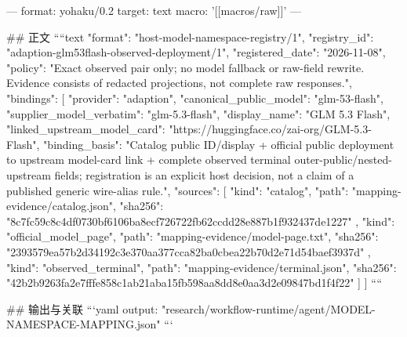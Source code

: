 ---
format: yohaku/0.2
target: text
macro: '[[macros/raw]]'
---

## 正文
````text
{
  "format": "host-model-namespace-registry/1",
  "registry_id": "adaption-glm53flash-observed-deployment/1",
  "registered_date": "2026-11-08",
  "policy": "Exact observed pair only; no model fallback or raw-field rewrite. Evidence consists of redacted projections, not complete raw responses.",
  "bindings": [
    {
      "provider": "adaption",
      "canonical_public_model": "glm-53-flash",
      "supplier_model_verbatim": "glm-5.3-flash",
      "display_name": "GLM 5.3 Flash",
      "linked_upstream_model_card": "https://huggingface.co/zai-org/GLM-5.3-Flash",
      "binding_basis": "Catalog public ID/display + official public deployment to upstream model-card link + complete observed terminal outer-public/nested-upstream fields; registration is an explicit host decision, not a claim of a published generic wire-alias rule.",
      "sources": [
        {
          "kind": "catalog",
          "path": "mapping-evidence/catalog.json",
          "sha256": "8c7fc59c8c4df0730bf6106ba8ecf726722fb62ccdd28e887b1f932437de1227"
        },
        {
          "kind": "official_model_page",
          "path": "mapping-evidence/model-page.txt",
          "sha256": "2393579ea57b2d34192c3e370aa377cca82ba0cbea22b70d2e71d54baef3937d"
        },
        {
          "kind": "observed_terminal",
          "path": "mapping-evidence/terminal.json",
          "sha256": "42b2b9263fa2e7fffe858c1ab21aba15fb598aa8dd8e0aa3d2e09847bd1f4f22"
        }
      ]
    }
  ]
}
````

## 输出与关联
```yaml
output: "research/workflow-runtime/agent/MODEL-NAMESPACE-MAPPING.json"
```

